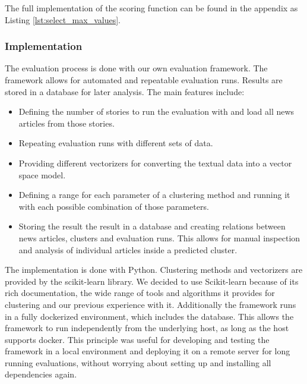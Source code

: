 The full implementation of the scoring function can be found in the appendix as Listing \ref{lst:select_max_values}.

\subsubsection{Implementation}
The evaluation process is done with our own evaluation framework.
The framework allows for automated and repeatable evaluation runs.
Results are stored in a database for later analysis.
The main features include:

\begin{itemize}
    \item Defining the number of stories to run the evaluation with and load all news articles from those stories.
    \item Repeating evaluation runs with different sets of data.
    \item Providing different vectorizers for converting the textual data into a vector space model.
    \item Defining a range for each parameter of a clustering method and running it with each possible combination of those parameters.
    \item Storing the result the result in a database and creating relations between news articles, clusters and evaluation runs. This allows for manual inspection and analysis of individual articles inside a predicted cluster.
\end{itemize}

The implementation is done with Python. Clustering methods and vectorizers are provided by the scikit-learn library\cite{scikit-learn}. We decided to use Scikit-learn because of its rich documentation, the wide range of tools and algorithms it provides for clustering and our previous experience with it. Additionally the framework runs in a fully dockerized environment, which includes the database. This allows the framework to run independently from the underlying host, as long as the host supports docker. This principle was useful for developing and testing the framework in a local environment and deploying it on a remote server for long running evaluations, without worrying about setting up and installing all dependencies again.

